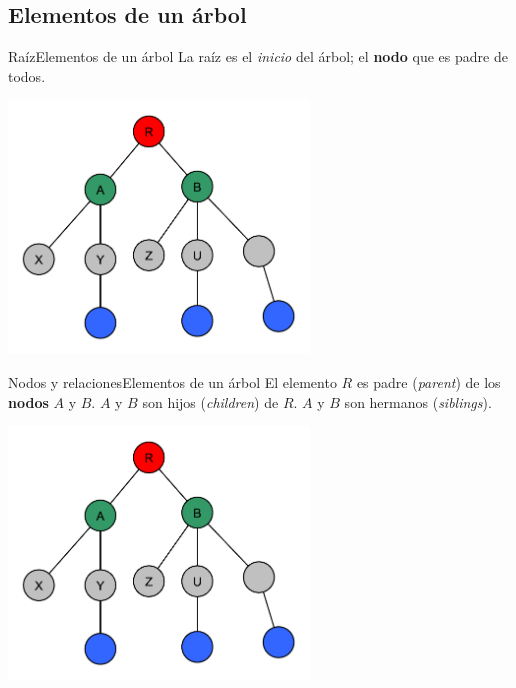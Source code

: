 \documentclass[usenames, dvipsnames, spanish, c]{beamer}
\begin{document}
\subsection{Elementos de un árbol}

\begin{frame}{Raíz}{Elementos de un árbol}
    La \alert{raíz} es el \textit{inicio} del árbol; el \textbf{nodo} que es padre de todos.

    \bigskip

    \begin{center}
        \includegraphics[width=0.6\textwidth]{naming.pdf}
    \end{center}
\end{frame}

\begin{frame}{Nodos y relaciones}{Elementos de un árbol}
    El elemento $R$ es \alert{padre} (\textit{parent}) de los \textbf{nodos} $A$ y $B$. $A$ y $B$ son \alert{hijos} (\textit{children}) de $R$. $A$ y $B$ son hermanos (\textit{siblings}).

    \bigskip

    \begin{center}
        \includegraphics[width=0.6\textwidth]{naming.pdf}
    \end{center}
\end{frame}
\end{document}
